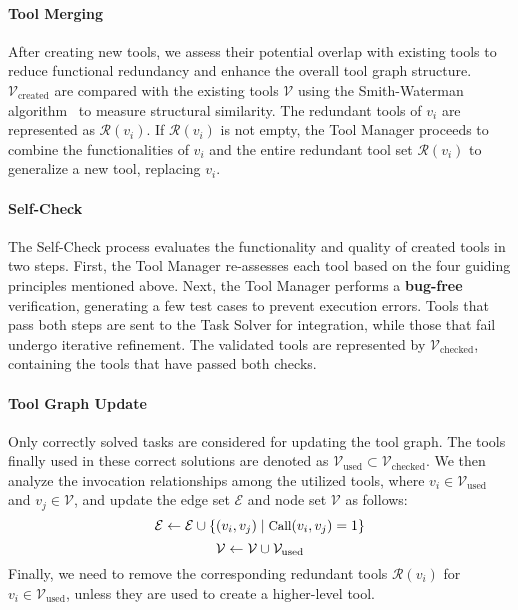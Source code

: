 \paragraph{Tool Merging}
After creating new tools, we assess their potential overlap with existing tools to reduce functional redundancy and enhance the overall tool graph structure. $\mathcal{V}_{\text{created}}$ are compared with the existing tools $\mathcal{V}$ using the Smith-Waterman algorithm~\citep{smith1981identification} to measure structural similarity. The redundant tools of $v_i$ are represented as $\mathcal{R}(v_i)$. If $\mathcal{R}(v_i)$ is not empty, the Tool Manager proceeds to combine the functionalities of $v_i$ and the entire redundant tool set $\mathcal{R}(v_i)$ to generalize a new tool, replacing $v_i$.

\vspace{-5pt}
\paragraph{Self-Check} The Self-Check process evaluates the functionality and quality of created tools in two steps. First, the Tool Manager re-assesses each tool based on the four guiding principles mentioned above. Next, the Tool Manager performs a \textbf{bug-free} verification, generating a few test cases to prevent execution errors. Tools that pass both steps are sent to the Task Solver for integration, while those that fail undergo iterative refinement. The validated tools are represented by $\mathcal{V}_{\text{checked}}$, containing the tools that have passed both checks.
\vspace{-5pt}
\paragraph{Tool Graph Update}
Only correctly solved tasks are considered for updating the tool graph. The tools finally used in these correct solutions are denoted as $\mathcal{V}_{\text{used}} \subset \mathcal{V}_{\text{checked}}$. We then analyze the invocation relationships among the utilized tools, where $v_i \in \mathcal{V}_{\text{used}}$ and $v_j \in \mathcal{V}$, and update the edge set $\mathcal{E}$ and node set $\mathcal{V}$ as follows:
\begin{equation}
{\small
\mathcal{E} \leftarrow \mathcal{E} \cup  
\left\{
(v_i, v_j) \mid \text{Call}(v_i, v_j) = 1
\right\}
}
\end{equation}
\vspace{-2pt}
\begin{equation}
{\small
\mathcal{V} \leftarrow \mathcal{V} \cup \mathcal{V}_{\text{used}}
}
\end{equation}
Finally, we need to remove the corresponding redundant tools $\mathcal{R}(v_i)$ for $v_i \in \mathcal{V}_{\text{used}}$, unless they are used to create a higher-level tool.


